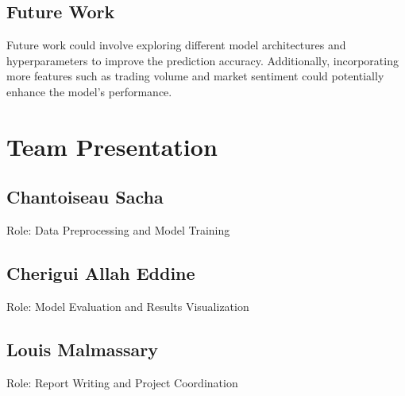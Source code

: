 \documentclass{article}
\begin{document}
\subsection{Future Work}
Future work could involve exploring different model architectures and hyperparameters to improve the prediction accuracy. Additionally, incorporating more features such as trading volume and market sentiment could potentially enhance the model's performance.

\section{Team Presentation}
\subsection{Chantoiseau Sacha}
Role: Data Preprocessing and Model Training

\subsection{Cherigui Allah Eddine}
Role: Model Evaluation and Results Visualization

\subsection{Louis Malmassary}
Role: Report Writing and Project Coordination
\end{document}
